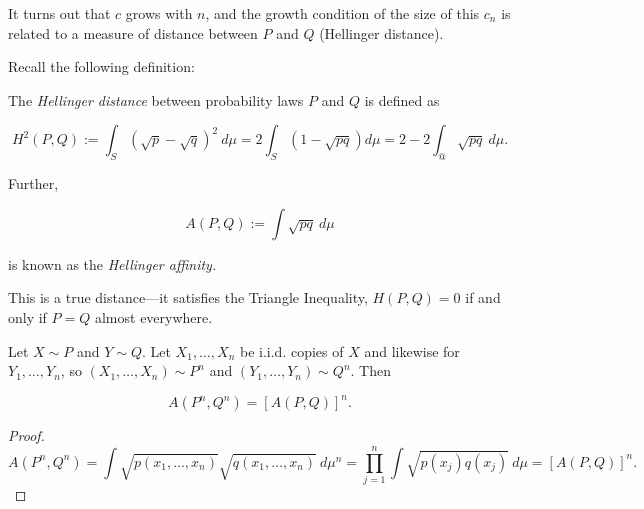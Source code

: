 It turns out that \(c\) grows with \(n\), and the growth condition of the size of this \(c_n\) is related to a measure of distance between \(P\) and \(Q\) (Hellinger distance). 

Recall the following definition:

\begin{definition}

The \textit{Hellinger distance} between probability laws \(P\) and \(Q\) is defined as 

\[
H^2(P,Q) := \int_S (\sqrt{p} - \sqrt{q})^2 \ d\mu = 2 \int_S (1 - \sqrt{pq}) d \mu = 2 - 2 \int_@ \sqrt{pq} \ d\mu.
\]

Further,

\[
A(P,Q) := \int \sqrt{pq} \ d\mu
\]

is known as the \textit{Hellinger affinity.} 


\end{definition}

\begin{remark}

This is a true distance---it satisfies the Triangle Inequality, \(H(P,Q) = 0\) if and only if \(P = Q\) almost everywhere.

\end{remark}

\begin{lemma}

Let \(X \sim P\) and \(Y \sim Q\). Let \(X_1, \ldots, X_n\) be i.i.d. copies of \(X\) and likewise for \(Y_1, \ldots, Y_n\), so \((X_1, \ldots, X_n) \sim P^n\) and \((Y_1, \ldots, Y_n) \sim Q^n\). Then

\[
A(P^n, Q^n) =  \left[ A(P, Q) \right]^n.
\]

\end{lemma}

\begin{proof}


\[
A(P^n, Q^n) = \int \sqrt{p(x_1, \ldots, x_n)} \sqrt{ q( x_1, \ldots, x_n) } \ d\mu^n 
= \prod_{j=1}^n \int \sqrt{p(x_j) q(x_j)} \ d\mu=  \left[ A(P, Q) \right]^n.
\]

\end{proof}

